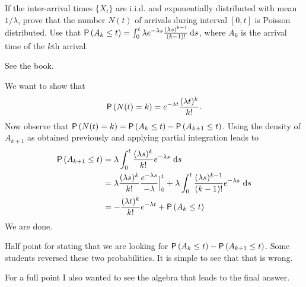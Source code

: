 \begin{exercise}[201706]
  If the inter-arrival times $\{X_i\}$ are i.i.d. and exponentially
  distributed with mean $1/\lambda$, prove that the number $N(t)$ of
  arrivals during interval $[0,t]$ is Poisson distributed.
Use that $\P{A_{k} \leq t}  = \int_0^t \lambda e^{-\lambda s} \frac{(\lambda s)^{k-1}}{(k-1)!} \d s$, where $A_k$ is the arrival time of the $k$th arrival.
\begin{solution}
See the book.

      We want to show that
    \begin{equation*}
      \P{N(t)=k} = e^{-\lambda t}\frac{(\lambda t)^k}{k!}.
    \end{equation*}
    Now observe that
    $\P{N(t)=k} = \P{A_k \leq t} - \P{A_{k+1} \leq t}$.  Using the
    density of $A_{k+1}$ as obtained previously and applying partial
    integration leads to
\begin{equation*}
  \begin{split}
\P{A_{k+1} \leq t} 
&= \lambda \int_0^t \frac{(\lambda s)^{k}}{k!}e^{-\lambda s}\, \d s \\
&= \lambda \frac{(\lambda s)^{k}}{k!}\frac{e^{-\lambda s}}{-\lambda} \Big|_{0}^t + \lambda \int_0^t \frac{(\lambda s)^{k-1}}{(k-1)!}e^{-\lambda s}\, \d s \\
&= - \frac{(\lambda t)^{k}}{k!} e^{-\lambda t} + \P{A_k \leq t}
  \end{split}
\end{equation*}
We are done.

Half point for stating that we are looking for $\P{A_k\leq t} - \P{A_{k+1}\leq t}$.  Some students reversed these two probabilities. It is simple to see that that is wrong.

For a full point I also wanted to see the algebra that leads to the final answer. 
\end{solution}
\end{exercise}

